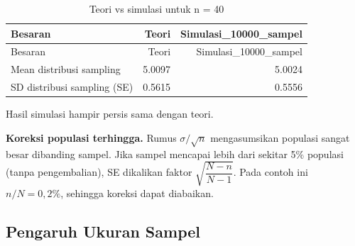 \documentclass[
  indonesian,
  letterpaper,
]{book}
\begin{document}
\begin{longtable}[]{@{}lrr@{}}
\caption{Teori vs simulasi untuk n = 40}\tabularnewline
\toprule\noalign{}
Besaran & Teori & Simulasi\_10000\_sampel \\
\midrule\noalign{}
\endfirsthead
\toprule\noalign{}
Besaran & Teori & Simulasi\_10000\_sampel \\
\midrule\noalign{}
\endhead
\bottomrule\noalign{}
\endlastfoot
Mean distribusi sampling & 5.0097 & 5.0024 \\
SD distribusi sampling (SE) & 0.5615 & 0.5556 \\
\end{longtable}

Hasil simulasi hampir persis sama dengan teori.

\textbf{Koreksi populasi terhingga.} Rumus \(\sigma/\sqrt{n}\)
mengasumsikan populasi sangat besar dibanding sampel. Jika sampel
mencapai lebih dari sekitar 5\% populasi (tanpa pengembalian), SE
dikalikan faktor \(\sqrt{\dfrac{N-n}{N-1}}\). Pada contoh ini
\(n/N = 0{,}2\%\), sehingga koreksi dapat diabaikan.

\subsection{Pengaruh Ukuran Sampel}\label{pengaruh-ukuran-sampel}
\end{document}
